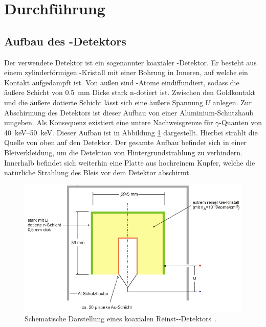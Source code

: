 \newpage
\section{Durchführung}
\label{sec:Durchführung}

\subsection{Aufbau des -Detektors}
\label{sec:AufbauDetektor}

Der verwendete Detektor ist ein sogenannter koaxialer -Detektor.
Er besteht aus einem zylinderförmigen -Kristall mit einer Bohrung in
Inneren, auf welche ein Kontakt aufgedampft ist. Von außen sind -Atome
eindiffundiert, sodass die äußere Schicht von \SI{0.5}{\milli\meter} Dicke
stark n-dotiert ist.
Zwischen den Goldkontakt und die äußere dotierte Schicht lässt sich eine äußere
Spannung $U$ anlegen.
Zur Abschirmung des Detektors ist dieser Aufbau von einer Aluminium-Schutzhaub
umgeben. Als Konsequenz existiert eine untere Nachweisgrenze für $\gamma$-Quanten
von \SIrange{40}{50}{\kilo\electronvolt}.
Dieser Aufbau ist in Abbildung \ref{fig:Versuchsaufbau} dargestellt.
Hierbei strahlt die Quelle von oben auf den Detektor.
Der gesamte Aufbau befindet sich in einer Bleiverkleidung, um die Detektion
von Hintergrundstrahlung zu verhindern. Innerhalb befindet sich weiterhin eine
Platte aus hochreinem Kupfer, welche die natürliche Strahlung des Bleis vor dem
Detektor abschirmt.
\begin{figure}
	\centering
	\includegraphics[width=.8\textwidth]{images/Versuchsaufbau.pdf}
	\caption{Schematische Darstellung eines koaxialen Reinst--Detektors~\cite[14]{anleitung}.}
	\label{fig:Versuchsaufbau}
\end{figure}

